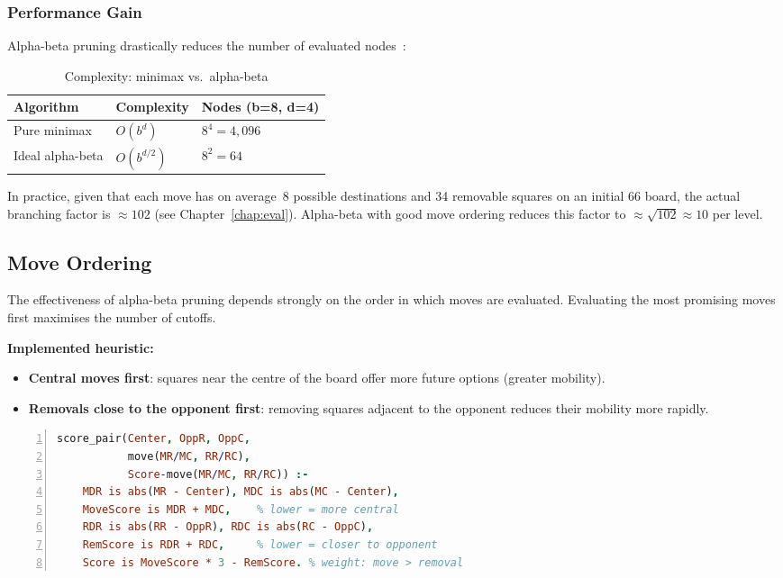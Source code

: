 \subsubsection{Performance Gain}

Alpha-beta pruning drastically reduces the number of evaluated nodes~\cite{knuth1975analysis}:

\begin{table}[htbp]
  \caption{Complexity: minimax vs.\ alpha-beta}
  \label{tab:complexity}
  \centering
  \begin{tabular}{lll}
    \toprule
    \textbf{Algorithm} & \textbf{Complexity} & \textbf{Nodes (b=8, d=4)} \\
    \midrule
    Pure minimax      & $O(b^d)$      & $8^4 = 4{,}096$ \\
    Ideal alpha-beta  & $O(b^{d/2})$  & $8^2 = 64$ \\
    \bottomrule
  \end{tabular}
\end{table}

In practice, given that each move has on average~8 possible destinations
and 34 removable squares on an initial 6{\texttimes}6 board,
the actual branching factor is $\approx 102$ (see
Chapter~\ref{chap:eval}). Alpha-beta with good move ordering reduces this
factor to $\approx \sqrt{102} \approx 10$ per level.

\subsection{Move Ordering}
\label{subsec:ordering}

The effectiveness of alpha-beta pruning depends strongly on the order
in which moves are evaluated. Evaluating the most promising moves first
maximises the number of cutoffs.

\textbf{Implemented heuristic:}
\begin{itemize}
  \item \textbf{Central moves first}: squares near the centre of the
        board offer more future options (greater mobility).
  \item \textbf{Removals close to the opponent first}: removing squares
        adjacent to the opponent reduces their mobility more rapidly.
\end{itemize}

\begin{lstlisting}[language=Prolog,
    caption={Scoring function for move ordering},
    label={lst:ordering},
    numbers=left,
    basicstyle=\small\ttfamily,
    frame=single]
score_pair(Center, OppR, OppC,
           move(MR/MC, RR/RC),
           Score-move(MR/MC, RR/RC)) :-
    MDR is abs(MR - Center), MDC is abs(MC - Center),
    MoveScore is MDR + MDC,    % lower = more central
    RDR is abs(RR - OppR), RDC is abs(RC - OppC),
    RemScore is RDR + RDC,     % lower = closer to opponent
    Score is MoveScore * 3 - RemScore. % weight: move > removal
\end{lstlisting}

